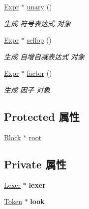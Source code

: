 \begin{DoxyCompactItemize}
\mbox{\label{class_parser_ac58cd88a976f4a7d147f5f815724f6a6}} 
\hyperlink{class_expr}{Expr} $\ast$ \hyperlink{class_parser_ac58cd88a976f4a7d147f5f815724f6a6}{unary} ()
\begin{DoxyCompactList}\small\item\em 生成 符号表达式 对象 \end{DoxyCompactList}\item 
\mbox{\label{class_parser_a3d5348cd92711fd39aea2b959e029e99}} 
\hyperlink{class_expr}{Expr} $\ast$ \hyperlink{class_parser_a3d5348cd92711fd39aea2b959e029e99}{selfop} ()
\begin{DoxyCompactList}\small\item\em 生成 自增自减表达式 对象 \end{DoxyCompactList}\item 
\mbox{\label{class_parser_ac85a997e91604de1d3505b3c8aaddf3b}} 
\hyperlink{class_expr}{Expr} $\ast$ \hyperlink{class_parser_ac85a997e91604de1d3505b3c8aaddf3b}{factor} ()
\begin{DoxyCompactList}\small\item\em 生成 因子 对象 \end{DoxyCompactList}\end{DoxyCompactItemize}
\subsection*{Protected 属性}
\begin{DoxyCompactItemize}
\item 
\hyperlink{class_block}{Block} $\ast$ \hyperlink{class_parser_a2c2aa893bb15b76ceea0330cad0c75cb}{root}
\end{DoxyCompactItemize}
\subsection*{Private 属性}
\begin{DoxyCompactItemize}
\item 
\mbox{\label{class_parser_a8a8214126b0b0455e3ce375f3e9b20bf}} 
\hyperlink{class_lexer}{Lexer} $\ast$ {\bfseries lexer}
\item 
\mbox{\label{class_parser_ac5d56e87794ceab4e8346bf4a60a5625}} 
\hyperlink{class_token}{Token} $\ast$ {\bfseries look}
\end{DoxyCompactItemize}


